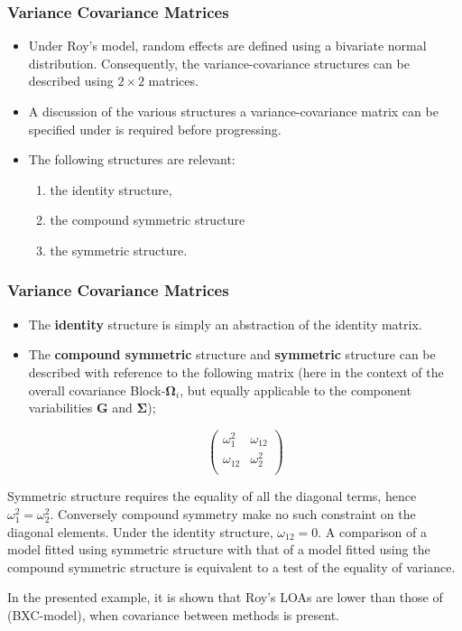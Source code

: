 \documentclass[compress]{beamer}        %
\begin{document}
\begin{frame}
\frametitle{Variance Covariance Matrices }

\begin{itemize}
\item Under Roy's model, random effects are defined using a bivariate normal distribution. Consequently, the variance-covariance structures can be described using $2 \times 2$  matrices. \item A discussion of the various structures a variance-covariance matrix can be specified under is required before progressing. 
\item The following structures are relevant:
\begin{enumerate}
\item the identity structure, 
\item the compound symmetric structure
\item the symmetric structure.
\end{enumerate}
\end{itemize}
\end{frame}
\begin{frame}
\frametitle{Variance Covariance Matrices }
\begin{itemize}
\item The \textbf{identity} structure is simply an abstraction of the identity matrix. 
\item The \textbf{compound symmetric} structure and \textbf{symmetric} structure can be described with reference to the following matrix (here in the context of the overall covariance Block-$\boldsymbol{\Omega}_i$, but equally applicable to the component variabilities $\boldsymbol{G}$ and $\boldsymbol{\Sigma}$);

\[\left( \begin{array}{cc}
              \omega^2_1  & \omega_{12} \\
              \omega_{12} & \omega^2_2 \\
\end{array}\right) \]
\end{itemize}
\end{frame}

\begin{frame}
Symmetric structure requires the equality of all the diagonal terms, hence $\omega^2_1 = \omega^2_2$. Conversely compound symmetry make no such constraint on the diagonal elements. Under the identity structure, $\omega_{12} = 0$.
A comparison of a model fitted using symmetric structure with that of a model fitted using the compound symmetric structure is equivalent to a test of the equality of variance.


In the presented example, it is shown that Roy's LOAs are lower than those of (\alert{BXC-model}), when covariance between methods is present.

\end{frame}
\end{document}
